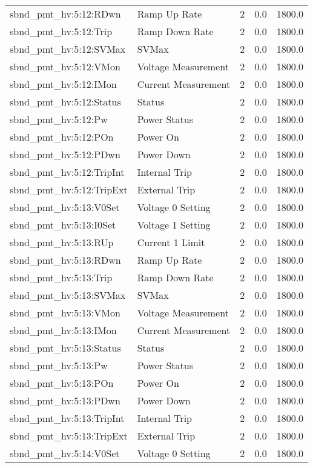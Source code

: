 \begin{center}
\begin{longtable}{l | l l l l }
sbnd\_pmt\_hv:5:12:RDwn & Ramp Up Rate & 2 & 0.0 & 1800.0\\ 
sbnd\_pmt\_hv:5:12:Trip & Ramp Down Rate & 2 & 0.0 & 1800.0\\ 
sbnd\_pmt\_hv:5:12:SVMax & SVMax & 2 & 0.0 & 1800.0\\ 
sbnd\_pmt\_hv:5:12:VMon & Voltage Measurement & 2 & 0.0 & 1800.0\\ 
sbnd\_pmt\_hv:5:12:IMon & Current Measurement & 2 & 0.0 & 1800.0\\ 
sbnd\_pmt\_hv:5:12:Status & Status & 2 & 0.0 & 1800.0\\ 
sbnd\_pmt\_hv:5:12:Pw & Power Status & 2 & 0.0 & 1800.0\\ 
sbnd\_pmt\_hv:5:12:POn & Power On & 2 & 0.0 & 1800.0\\ 
sbnd\_pmt\_hv:5:12:PDwn & Power Down & 2 & 0.0 & 1800.0\\ 
sbnd\_pmt\_hv:5:12:TripInt & Internal Trip & 2 & 0.0 & 1800.0\\ 
sbnd\_pmt\_hv:5:12:TripExt & External Trip & 2 & 0.0 & 1800.0\\ 
sbnd\_pmt\_hv:5:13:V0Set & Voltage 0 Setting & 2 & 0.0 & 1800.0\\ 
sbnd\_pmt\_hv:5:13:I0Set & Voltage 1 Setting & 2 & 0.0 & 1800.0\\ 
sbnd\_pmt\_hv:5:13:RUp & Current 1 Limit & 2 & 0.0 & 1800.0\\ 
sbnd\_pmt\_hv:5:13:RDwn & Ramp Up Rate & 2 & 0.0 & 1800.0\\ 
sbnd\_pmt\_hv:5:13:Trip & Ramp Down Rate & 2 & 0.0 & 1800.0\\ 
sbnd\_pmt\_hv:5:13:SVMax & SVMax & 2 & 0.0 & 1800.0\\ 
sbnd\_pmt\_hv:5:13:VMon & Voltage Measurement & 2 & 0.0 & 1800.0\\ 
sbnd\_pmt\_hv:5:13:IMon & Current Measurement & 2 & 0.0 & 1800.0\\ 
sbnd\_pmt\_hv:5:13:Status & Status & 2 & 0.0 & 1800.0\\ 
sbnd\_pmt\_hv:5:13:Pw & Power Status & 2 & 0.0 & 1800.0\\ 
sbnd\_pmt\_hv:5:13:POn & Power On & 2 & 0.0 & 1800.0\\ 
sbnd\_pmt\_hv:5:13:PDwn & Power Down & 2 & 0.0 & 1800.0\\ 
sbnd\_pmt\_hv:5:13:TripInt & Internal Trip & 2 & 0.0 & 1800.0\\ 
sbnd\_pmt\_hv:5:13:TripExt & External Trip & 2 & 0.0 & 1800.0\\ 
sbnd\_pmt\_hv:5:14:V0Set & Voltage 0 Setting & 2 & 0.0 & 1800.0\\ 

\end{longtable}
\end{center}
